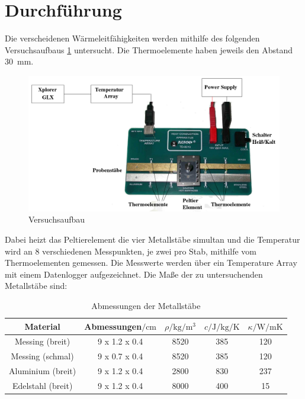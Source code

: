 \section{Durchführung}
\label{sec:Durchführung}
Die verscheidenen Wärmeleitfähigkeiten werden mithilfe des folgenden Versuchsaufbaus \ref{fig:aufbau}
untersucht. Die Thermoelemente haben jeweils den Abstand \SI{30}{\milli\meter}.
\begin{figure}
    \centering
    \includegraphics[width=\textwidth]{content/aufbau.png}
    \caption{Versuchsaufbau\cite{v204}}
    \label{fig:aufbau}
\end{figure}
Dabei heizt das Peltierelement die vier Metallstäbe simultan und die Temperatur wird an 8
verschiedenen Messpunkten, je zwei pro Stab, mithilfe vom Thermoelementen gemessen. Die
Messwerte werden über ein Temperature Array mit einem Datenlogger aufgezeichnet.
Die Maße der zu untersuchenden Metallstäbe sind:
\begin{table}
    \centering
    \caption{Abmessungen der Metallstäbe \cite{v204}}
    \label{tab:werte}
    \begin{tabular}{c c S S S}
        \toprule
        {Material} & {Abmessungen$/\si{\centi\meter}$} &{$\rho/\si{\kg\per\meter\cubed}$} &{$c/\si{\joule\per\kg\per\kelvin}$} &{$\kappa/\si{\watt\per\meter\kelvin}$\cite{waermeleit}} \\
        \midrule
        Messing (breit) & 9 x 1.2 x 0.4 & 8520 & 385 & 120 \\
        Messing (schmal) & 9 x 0.7 x 0.4 & 8520 & 385 & 120 \\
        Aluminium (breit) & 9 x 1.2 x 0.4 & 2800 & 830 & 237 \\
        Edelstahl (breit) & 9 x 1.2 x 0.4 & 8000 & 400 & 15 \\
        \bottomrule
    \end{tabular}
\end{table}
%
